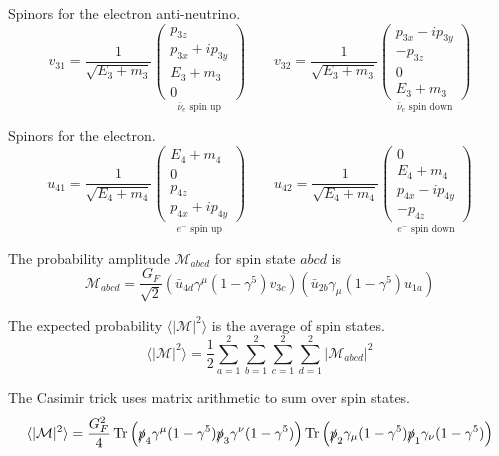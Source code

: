 Spinors for the electron anti-neutrino.
\begin{equation*}
v_{31}=\frac{1}{\sqrt{E_3+m_3}}
\underset{\text{$\bar{\nu}_e$ spin up}}
{\begin{pmatrix}p_{3z}\\p_{3x}+ip_{3y}\\E_3+m_3\\0\end{pmatrix}}
\qquad
v_{32}=\frac{1}{\sqrt{E_3+m_3}}
\underset{\text{$\bar{\nu}_e$ spin down}}
{\begin{pmatrix}p_{3x}-ip_{3y}\\-p_{3z}\\0\\E_3+m_3\end{pmatrix}}
\end{equation*}

Spinors for the electron.
\begin{equation*}
u_{41}=\frac{1}{\sqrt{E_4+m_4}}
\underset{\text{$e^-$ spin up}}
{\begin{pmatrix}E_4+m_4\\0\\p_{4z}\\p_{4x}+ip_{4y}\end{pmatrix}}
\qquad
u_{42}=\frac{1}{\sqrt{E_4+m_4}}
\underset{\text{$e^-$ spin down}}
{\begin{pmatrix}0\\E_4+m_4\\p_{4x}-ip_{4y}\\-p_{4z}\end{pmatrix}}
\end{equation*}

The probability amplitude $\mathcal{M}_{abcd}$ for spin state $abcd$ is
\begin{equation*}
\mathcal{M}_{abcd}=\frac{G_F}{\sqrt{2}}
\left(
\bar u_{4d}
\gamma^\mu(1-\gamma^5)
v_{3c}
\right)
\left(
\bar u_{2b}
\gamma_\mu(1-\gamma^5)
u_{1a}
\right)
\end{equation*}

The expected probability $\langle|\mathcal{M}|^2\rangle$ is the average of spin states.
\begin{equation*}
\langle|\mathcal{M}|^2\rangle=
\frac{1}{2}
\sum_{a=1}^2\sum_{b=1}^2\sum_{c=1}^2\sum_{d=1}^2
|\mathcal{M}_{abcd}|^2
\end{equation*}

The Casimir trick uses matrix arithmetic to sum over spin states.
\begin{equation*}
\langle|\mathcal{M}|^2\rangle
=\frac{G_F^2}{4}
\mathop{\text{Tr}}
\left(\slashed{p}_4\gamma^\mu(1-\gamma^5)\slashed{p}_3\gamma^\nu(1-\gamma^5)\right)
\mathop{\text{Tr}}
\left(\slashed{p}_2\gamma_\mu(1-\gamma^5)\slashed{p}_1\gamma_\nu(1-\gamma^5)\right)
\end{equation*}

